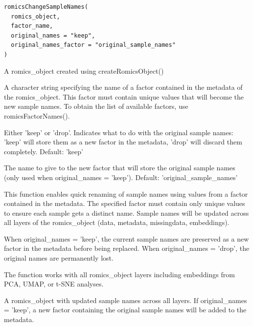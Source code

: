 \documentclass[a4paper]{book}
\begin{document}
%
\begin{Usage}
\begin{verbatim}
romicsChangeSampleNames(
  romics_object,
  factor_name,
  original_names = "keep",
  original_names_factor = "original_sample_names"
)
\end{verbatim}
\end{Usage}
%
\begin{Arguments}
\begin{ldescription}
\item[\code{romics\_object}] A romics\_object created using createRomicsObject()

\item[\code{factor\_name}] A character string specifying the name of a factor contained in the metadata of the romics\_object.
This factor must contain unique values that will become the new sample names.
To obtain the list of available factors, use romicsFactorNames().

\item[\code{original\_names}] Either 'keep' or 'drop'. Indicates what to do with the original sample names:
'keep' will store them as a new factor in the metadata, 'drop' will discard them completely. Default: 'keep'

\item[\code{original\_names\_factor}] The name to give to the new factor that will store the original sample names
(only used when original\_names = 'keep'). Default: 'original\_sample\_names'
\end{ldescription}
\end{Arguments}
%
\begin{Details}
This function enables quick renaming of sample names using values from a factor contained in the metadata.
The specified factor must contain only unique values to ensure each sample gets a distinct name.
Sample names will be updated across all layers of the romics\_object (data, metadata, missingdata, embeddings).

When original\_names = 'keep', the current sample names are preserved as a new factor in the metadata
before being replaced. When original\_names = 'drop', the original names are permanently lost.

The function works with all romics\_object layers including embeddings from PCA, UMAP, or t-SNE analyses.
\end{Details}
%
\begin{Value}
A romics\_object with updated sample names across all layers. If original\_names = 'keep',
a new factor containing the original sample names will be added to the metadata.
\end{Value}
\end{document}
